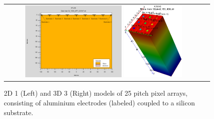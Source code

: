 \begin{figure}[h]
  \begin{center}
    \begin{tabular}{cc}
      \includegraphics[width=0.5\textwidth]{fig_FastTiming/Materials.png}
      \includegraphics[width=0.3\textwidth]{fig_FastTiming/Model3D.png}
    \end{tabular}
    \caption{2D 1  (Left) and 3D 3  (Right) models of \SI{25}{\micron} pitch pixel arrays, consisting of aluminium electrodes (labeled) coupled to a silicon substrate.
            }
    \label{Materials_Model}
  \end{center}
\end{figure}
